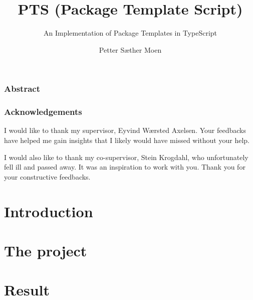 \documentclass[UKenglish]{ifimaster}
\title{PTS (Package Template Script)}
\subtitle{An Implementation of Package Templates in TypeScript}
\author{Petter Sæther Moen}
\begin{document}


\mnfrontpage

\frontmatter{}

\tableofcontents{}

\clearpage
\section*{Abstract}

\cleardoublepage

\section*{Acknowledgements}

I would like to thank my supervisor, Eyvind Wærsted Axelsen.
Your feedbacks have helped me gain insights that I likely would have missed without your help.

I would also like to thank my co-supervisor, Stein Krogdahl, who unfortunately fell ill and passed away.
It was an inspiration to work with you.
Thank you for your constructive feedbacks.

\cleardoublepage

\mainmatter{}


\part{Introduction}\label{part:introduction}





\part{The project}\label{part:the-project}







\part{Result}\label{part:Results}






\backmatter{}
\printbibliography
\end{document}
